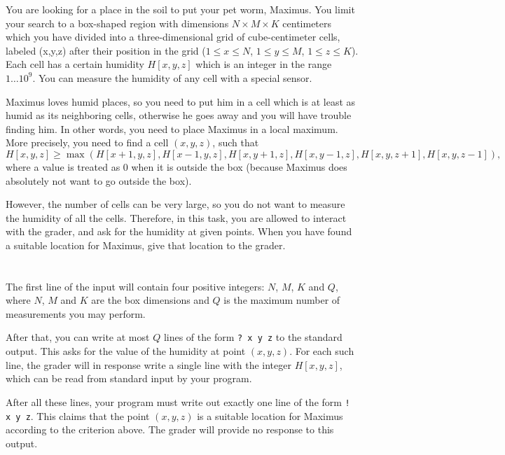 \ifx\boi\undefined\fi
\def\version{jury-draft}

You are looking for a place in the soil to put your pet worm, Maximus. You limit your search to a box-shaped region with dimensions $N \times M \times K$ centimeters which you have divided into a three-dimensional grid of cube-centimeter cells, labeled (x,y,z) after their position in the grid ($1 \le x \le N$, $1 \le y \le M$, $1 \le z \le K$). Each cell has a certain humidity $H[x,y,z]$ which is an integer in the range $1 \dots 10^9$. You can measure the humidity of any cell with a special sensor.  

Maximus loves humid places, so you need to put him in a cell which is at least as humid as its neighboring cells, otherwise he goes away and you will have trouble finding him. In other words, you need to place Maximus in a local maximum. More precisely, you need to find a cell $(x,y,z)$, such that 
$$
H[x,y,z] \ge \max(H[x+1, y, z], H[x-1,y,z], H[x,y+1,z], H[x,y-1,z],H[x,y,z+1],H[x,y,z-1] ),
$$
where a value is treated as $0$ when it is outside the box (because Maximus does absolutely not want to go outside the box).

However, the number of cells can be very large, so you do not want to measure the humidity of all the cells. Therefore, in this task, you are allowed to interact with the grader, and ask for the humidity at given points.
When you have found a suitable location for Maximus, give that location to the grader.

\section*{\interactivity}
The first line of the input will contain four positive integers: $N$, $M$, $K$ and $Q$, where $N$, $M$ and $K$ are the box dimensions and $Q$ is the maximum number of measurements you may perform.

After that, you can write at most $Q$ lines of the form \texttt{? x y z} to the standard output.
This asks for the value of the humidity at point $(x, y, z)$.
For each such line, the grader will in response write a single line with the integer $H[x,y,z]$, which can be read from standard input by your program.

After all these lines, your program must write out exactly one line of the form \texttt{! x y z}.
This claims that the point $(x, y, z)$ is a suitable location for Maximus according to the criterion above.
The grader will provide no response to this output.

